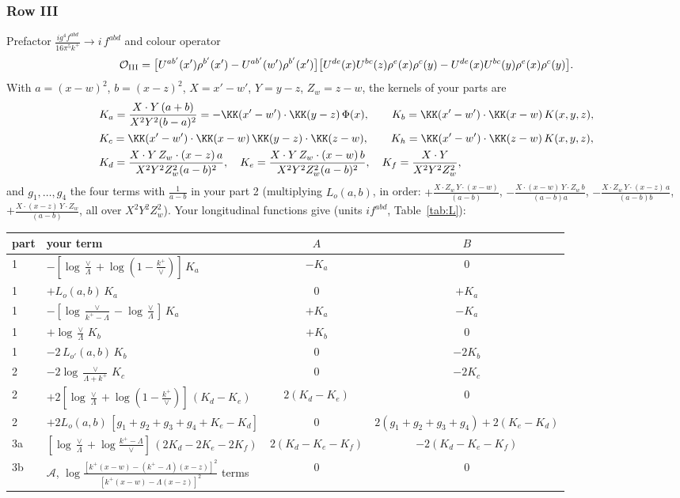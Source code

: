 \subsubsection{Row III}\label{sec:I.III}
Prefactor $\frac{ig^4f^{abd}}{16\pi^5k^+}\to i\,f^{abd}$ and colour operator
\[
\mathcal O_{\rm III}=\big[U^{ab'}(x')\rho^{b'}(x')-U^{ab'}(w')\rho^{b'}(x')\big]\big[U^{de}(x)U^{bc}(z)\rho^e(x)\rho^c(y)-U^{de}(x)U^{bc}(y)\rho^e(x)\rho^c(y)\big].
\]
With $a=(x-w)^2$, $b=(x-z)^2$, $X=x'-w'$, $Y=y-z$, $Z_w=z-w$, the kernels of your parts are
\begin{align*}
&K_a=\frac{X\cdot Y\,(a+b)}{X^2Y^2(b-a)^2}=-\KK(x'-w')\cdot\KK(y-z)\,\Phi(x),\qquad K_b=\KK(x'-w')\cdot\KK(x-w)\,K(x,y,z),\\
&K_c=\KK(x'-w')\cdot\KK(x-w)\,\KK(y-z)\cdot\KK(z-w),\qquad K_h=\KK(x'-w')\cdot\KK(z-w)\,K(x,y,z),\\
&K_d=\frac{X\cdot Y\,Z_w\cdot(x-z)\,a}{X^2Y^2Z_w^2(a-b)^2},\quad K_e=\frac{X\cdot Y\,Z_w\cdot(x-w)\,b}{X^2Y^2Z_w^2(a-b)^2},\quad K_f=\frac{X\cdot Y}{X^2Y^2Z_w^2},
\end{align*}
and $g_1,\dots,g_4$ the four terms with $\frac1{a-b}$ in your part 2 (multiplying $L_o(a,b)$, in order: $+\frac{X\cdot Z_w\,Y\cdot(x-w)}{(a-b)}$, $-\frac{X\cdot(x-w)\,Y\cdot Z_w\,b}{(a-b)a}$, $-\frac{X\cdot Z_w\,Y\cdot(x-z)\,a}{(a-b)b}$, $+\frac{X\cdot(x-z)\,Y\cdot Z_w}{(a-b)}$, all over $X^2Y^2Z_w^2$). Your longitudinal functions give (units $i f^{abd}$, Table~\ref{tab:L}):
\begin{center}\small
\begin{tabular}{@{}l l c c@{}}
part & your term & $A$ & $B$\\ \hline
1 & $-[\log\frac{\vee}{\Lambda}+\log(1-\frac{k^+}{\vee})]\,K_a$ & $-K_a$ & 0\\
1 & $+L_o(a,b)\,K_a$ & 0 & $+K_a$\\
1 & $-[\log\frac{\vee}{k^+-\Lambda}-\log\frac{\vee}{\Lambda}]\,K_a$ & $+K_a$ & $-K_a$\\
1 & $+\log\frac{\vee}{\Lambda}\,K_b$ & $+K_b$ & 0\\
1 & $-2\,L_{o'}(a,b)\,K_b$ & 0 & $-2K_b$\\
2 & $-2\log\frac{\vee}{\Lambda+k^+}\,K_c$ & 0 & $-2K_c$\\
2 & $+2[\log\frac{\vee}{\Lambda}+\log(1-\frac{k^+}{\vee})]\,(K_d-K_e)$ & $2(K_d-K_e)$ & 0\\
2 & $+2L_o(a,b)\,[g_1+g_2+g_3+g_4+K_e-K_d]$ & 0 & $2(g_1+g_2+g_3+g_4)+2(K_e-K_d)$\\
3a & $[\log\frac{\vee}{\Lambda}+\log\frac{k^+-\Lambda}{\vee}]\,(2K_d-2K_e-2K_f)$ & $2(K_d-K_e-K_f)$ & $-2(K_d-K_e-K_f)$\\
3b & $\mathcal A$, $\log\frac{[k^+(x-w)-(k^+-\Lambda)(x-z)]^2}{[k^+(x-w)-\Lambda(x-z)]^2}$ terms & 0 & 0\\
\end{tabular}
\end{center}
